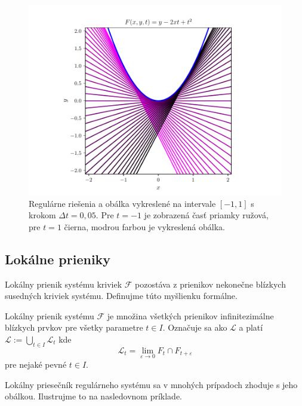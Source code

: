 \begin{figure}[h]
	\centering
	\includegraphics[trim={0 0.35cm 0 0.85cm},clip]{images/odr.pdf}
	\caption[Regulárne riešenia a obálka.]{Regulárne riešenia a obálka vykreslené na intervale $[-1,1]$ s krokom $\Delta t = 0,05$. Pre $t=-1$ je zobrazená časť priamky ružová, pre $t=1$ čierna, modrou farbou je vykreslená obálka.}
	\label{fig:odr}
\end{figure}

\subsection{Lokálne prieniky} \label{lokalne prieniky pre krivky}
Lokálny prienik systému kriviek $\mathcal{F} $ pozostáva z prienikov nekonečne blízkych susedných kriviek systému. Definujme túto myšlienku formálne.
\begin{definition} \label{def:lokalny prienik}
Lokálny prienik systému $\mathcal{F}$ je množina všetkých prienikov infinitezimálne blízkych prvkov pre všetky parametre $t \in I$. Označuje sa ako $\mathcal{L}$ a platí
$
\mathcal{L} := \bigcup_{t \in I} \mathcal{L}_{t}
$ kde
$$
\mathcal{L}_{t} = \lim_{\varepsilon \to 0} F_{t} \cap F_{t + \varepsilon}
$$
pre nejaké pevné $t \in I.$
\end{definition}
Lokálny priesečník regulárneho systému sa v mnohých prípadoch zhoduje s jeho obálkou. Ilustrujme to na nasledovnom príklade.

